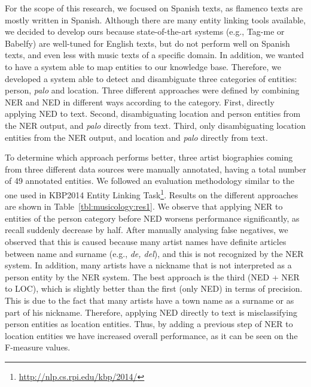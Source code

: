 For the scope of this research, we focused on Spanish texts, as flamenco texts are mostly written in Spanish. Although there are many entity linking tools available, we decided to develop ours because state-of-the-art systems (e.g., Tag-me or Babelfy) are well-tuned for English texts, but do not perform well on Spanish texts, and even less with music texts of a specific domain. In addition, we wanted to have a system able to map entities to our knowledge base. Therefore, we developed a system able to detect and disambiguate three categories of entities: person, \textit{palo} and location. Three different approaches were defined by combining NER and NED in different ways according to the category. First, directly applying NED to text. Second, disambiguating location and person entities from the NER output, and \textit{palo} directly from text. Third, only disambiguating location entities from the NER output, and location and \textit{palo} directly from text.

To determine which approach performs better, three artist biographies coming from three different data sources were manually annotated, having a total number of 49 annotated entities. We followed an evaluation methodology similar to the one used in KBP2014 Entity Linking Task\footnote{\url{http://nlp.cs.rpi.edu/kbp/2014/}}. Results on the different approaches are shown in Table~\ref{tbl:musicology:res1}. We observe that applying NER to entities of the person category before NED worsens performance significantly, as recall suddenly decrease by half. After manually analysing false negatives, we observed that this is caused because many artist names have definite articles between name and surname (e.g., \textit{de, del}), and this is not recognized by the NER system. In addition, many artists have a nickname that is not interpreted as a person entity by the NER system. The best approach is the third (NED + NER to LOC), which is slightly better than the first (only NED) in terms of precision. This is due to the fact that many artists have a town name as a surname or as part of his nickname. Therefore, applying NED directly to text is misclassifying person entities as location entities. Thus, by adding a previous step of NER to location entities we have increased overall performance, as it can be seen on the F-measure values.

